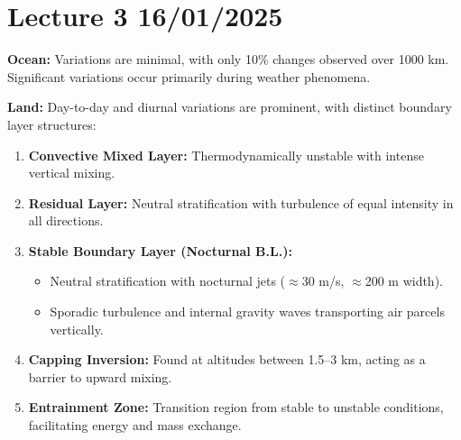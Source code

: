 \documentclass[fleqn,10pt]{SelfArx} %
\begin{document}
\clearpage
\section{Lecture 3 16/01/2025}

\textbf{Ocean:} Variations are minimal, with only 10\% changes observed over 1000 km. Significant variations occur primarily during weather phenomena.

\textbf{Land:} Day-to-day and diurnal variations are prominent, with distinct boundary layer structures:

\begin{enumerate}[noitemsep]
	\item \textbf{Convective Mixed Layer:} Thermodynamically unstable with intense vertical mixing.
	\item \textbf{Residual Layer:} Neutral stratification with turbulence of equal intensity in all directions.
	\item \textbf{Stable Boundary Layer (Nocturnal B.L.):}
	      \begin{itemize}[noitemsep, topsep=0pt, partopsep=0pt]
		      \item Neutral stratification with nocturnal jets (\(\approx \)30 m/s, \( \approx \)200 m width).
		      \item Sporadic turbulence and internal gravity waves transporting air parcels vertically.
	      \end{itemize}
	\item \textbf{Capping Inversion:} Found at altitudes between 1.5–3 km, acting as a barrier to upward mixing.
	\item \textbf{Entrainment Zone:} Transition region from stable to unstable conditions, facilitating energy and mass exchange.
\end{enumerate}
\end{document}
